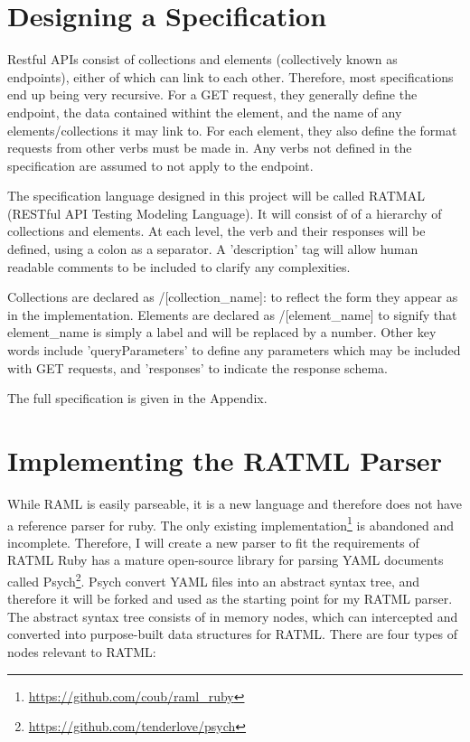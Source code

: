 \section{Designing a Specification}

Restful APIs consist of collections and elements (collectively known as endpoints), either of which can link to each other. Therefore, most specifications end up being very recursive. For a GET request, they generally define the endpoint, the data contained withint the element, and the name of any elements/collections it may link to. For each element, they also define the format requests from other verbs must be made in. Any verbs not defined in the specification are assumed to not apply to the endpoint.

The specification language designed in this project will be called RATMAL (RESTful API Testing Modeling Language). It will consist of of a hierarchy of collections and elements. At each level, the verb and their responses will be defined, using a colon as a separator. A 'description' tag will allow human readable comments to be included to clarify any complexities.

Collections are declared as /[collection\_name]: to reflect the form they appear as in the implementation. Elements are declared as /{[element\_name]} to signify that element\_name is simply a label and will be replaced by a number. Other key words include 'queryParameters' to define any parameters which may be included with GET requests, and 'responses' to indicate the response schema.

The full specification is given in the Appendix.

\section{Implementing the RATML Parser}

While RAML is easily parseable, it is a new language and therefore does not have a reference parser for ruby. The only existing implementation\footnote{\url{https://github.com/coub/raml_ruby}} is abandoned and incomplete. Therefore, I will create a new parser to  fit the requirements of RATML Ruby has a mature open-source library for parsing YAML documents called Psych\footnote{\url{https://github.com/tenderlove/psych}}. Psych  convert YAML files into an abstract syntax tree, and therefore it will be forked and used as the starting point for my RATML parser. The abstract syntax tree consists of in memory nodes, which can intercepted and converted into purpose-built data structures for RATML. There are four types of nodes relevant to RATML:


